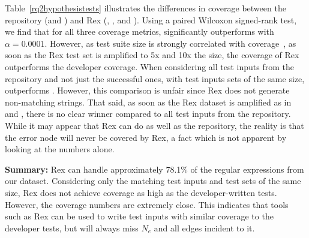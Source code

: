 Table~\ref{rq2hypothesistests} illustrates the differences in coverage between the repository (\RepoTwoS and \RepoTwoT) and Rex (\RexSOne, \RexSFive, and \RexSTen). Using a paired Wilcoxon signed-rank test, we find that for all three coverage metrics, \RepoTwoS significantly outperforms \RexSOne  with $\alpha = 0.0001$. However, as test suite size is strongly correlated with coverage~\cite{coveragetestsuitecorrelation}, as soon as the Rex test set is amplified to 5x and 10x the size, the coverage of Rex outperforms the developer coverage. 
When considering all test inputs from the repository and not just the successful ones, with test inputs sets of the same size, \RepoTwoT outperforms \RexSOne. However,  this comparison is unfair since Rex does not generate non-matching strings. That said, as soon as the Rex dataset is amplified as in \RexSFive and \RexSTen, there is no clear winner compared to all test inputs from the repository. 
While it may appear that Rex can do as well as the repository, the reality is that the error node will never be covered by Rex, a fact which is not apparent by looking at the numbers alone.  




\textbf{Summary:}
Rex can handle approximately 78.1\% of the regular expressions from our dataset. %
Considering only the matching test inputs and test sets of the same size, Rex does not achieve coverage as high as the developer-written tests. However, the coverage numbers are extremely close. This indicates that tools such as Rex can be used to write test inputs with similar coverage to the developer tests, but will always miss $N_e$ and all edges incident to it. 

